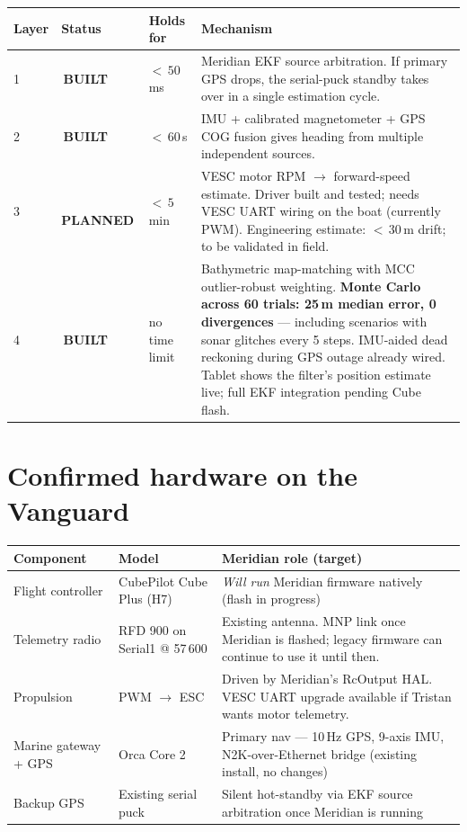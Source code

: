 \documentclass[10pt,a4paper]{article}
\newcommand{\statusbuilt}{{\color{white}\colorbox{mSafe}{\small\bfseries\,BUILT\,}}}
\newcommand{\statusplan}{{\color{white}\colorbox{mWarn}{\small\bfseries\,PLANNED\,}}}
\begin{document}
\begin{tabularx}{\textwidth}{@{}l l l X@{}}
\toprule
\textbf{Layer} & \textbf{Status} & \textbf{Holds for} & \textbf{Mechanism} \\
\midrule
\rowcolor{mRow} 1 & \statusbuilt & ${<}\,50$\,ms & Meridian EKF source arbitration. If primary GPS drops, the serial-puck standby takes over in a single estimation cycle. \\
2 & \statusbuilt & ${<}\,60$\,s & IMU + calibrated magnetometer + GPS COG fusion gives heading from multiple independent sources. \\
\rowcolor{mRow} 3 & \statusplan & ${<}\,5$\,min & VESC motor RPM $\rightarrow$ forward-speed estimate. Driver built and tested; needs VESC UART wiring on the boat (currently PWM). Engineering estimate: ${<}\,30$\,m drift; to be validated in field. \\
4 & \statusbuilt & no time limit & Bathymetric map-matching with MCC outlier-robust weighting. \textbf{Monte Carlo across 60 trials: 25\,m median error, 0 divergences} — including scenarios with sonar glitches every 5 steps. IMU-aided dead reckoning during GPS outage already wired. Tablet shows the filter's position estimate live; full EKF integration pending Cube flash. \\
\bottomrule
\end{tabularx}

\section{Confirmed hardware on the Vanguard}
\begin{tabularx}{\textwidth}{@{}l l X@{}}
\toprule
\textbf{Component} & \textbf{Model} & \textbf{Meridian role (target)} \\
\midrule
\rowcolor{mRow} Flight controller & CubePilot Cube Plus (H7) & \textit{Will run} Meridian firmware natively (flash in progress) \\
Telemetry radio  & RFD 900 on Serial1 @ 57\,600 & Existing antenna. MNP link once Meridian is flashed; legacy firmware can continue to use it until then. \\
\rowcolor{mRow} Propulsion & PWM $\rightarrow$ ESC & Driven by Meridian's RcOutput HAL. VESC UART upgrade available if Tristan wants motor telemetry. \\
Marine gateway + GPS & Orca Core 2 & Primary nav — 10\,Hz GPS, 9-axis IMU, N2K-over-Ethernet bridge (existing install, no changes) \\
\rowcolor{mRow} Backup GPS & Existing serial puck & Silent hot-standby via EKF source arbitration once Meridian is running \\
\bottomrule
\end{tabularx}
\end{document}
